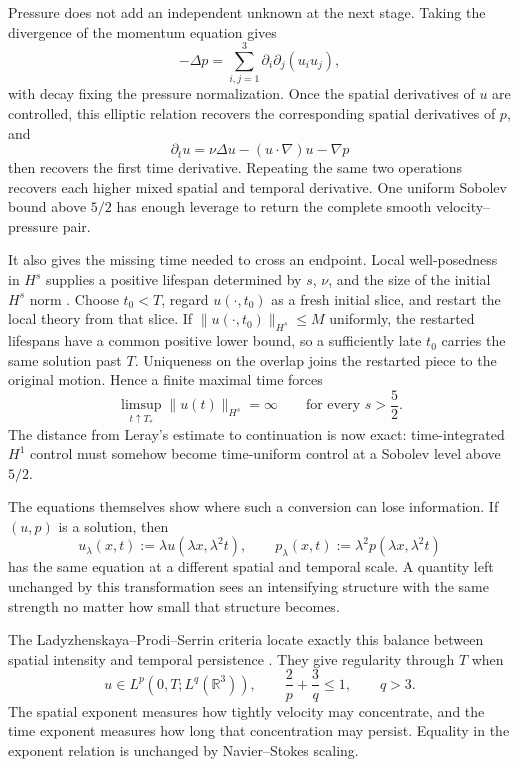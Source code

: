 Pressure does not add an independent unknown at the next stage.
Taking the divergence of the momentum equation gives
\[
  -\Delta p
  =
  \sum_{i,j=1}^3\partial_i\partial_j(u_i u_j),
\]
with decay fixing the pressure normalization.
Once the spatial derivatives of \(u\) are controlled, this elliptic relation recovers the corresponding spatial derivatives of \(p\), and
\[
  \partial_tu
  =
  \nu\Delta u-(u\cdot\nabla)u-\nabla p
\]
then recovers the first time derivative.
Repeating the same two operations recovers each higher mixed spatial and temporal derivative.
One uniform Sobolev bound above \(5/2\) has enough leverage to return the complete smooth velocity--pressure pair.

It also gives the missing time needed to cross an endpoint.
Local well-posedness in \(H^s\) supplies a positive lifespan determined by \(s\), \(\nu\), and the size of the initial \(H^s\) norm \parencite{FujitaKato1964,Kato1984}.
Choose \(t_0<T\), regard \(u(\cdot,t_0)\) as a fresh initial slice, and restart the local theory from that slice.
If \(\lVert u(\cdot,t_0)\rVert_{H^s}\leq M\) uniformly, the restarted lifespans have a common positive lower bound, so a sufficiently late \(t_0\) carries the same solution past \(T\).
Uniqueness on the overlap joins the restarted piece to the original motion.
Hence a finite maximal time forces
\[
  \limsup_{t\uparrow T_*}
  \lVert u(t)\rVert_{H^s}
  =\infty
  \qquad
  \text{for every }s>\frac52.
\]
The distance from Leray's estimate to continuation is now exact: time-integrated \(H^1\) control must somehow become time-uniform control at a Sobolev level above \(5/2\).


The equations themselves show where such a conversion can lose information.
If \((u,p)\) is a solution, then
\[
  u_\lambda(x,t)
  :=
  \lambda u(\lambda x,\lambda^2t),
  \qquad
  p_\lambda(x,t)
  :=
  \lambda^2p(\lambda x,\lambda^2t)
\]
has the same equation at a different spatial and temporal scale.
A quantity left unchanged by this transformation sees an intensifying structure with the same strength no matter how small that structure becomes.

The Ladyzhenskaya--Prodi--Serrin criteria locate exactly this balance between spatial intensity and temporal persistence \parencite{Prodi1959,Serrin1962,Serrin1963,Ladyzhenskaya1967}.
They give regularity through \(T\) when
\[
  u\in L^p(0,T;L^q(\mathbb R^3)),
  \qquad
  \frac{2}{p}+\frac{3}{q}\leq1,
  \qquad
  q>3.
\]
The spatial exponent measures how tightly velocity may concentrate, and the time exponent measures how long that concentration may persist.
Equality in the exponent relation is unchanged by Navier--Stokes scaling.

